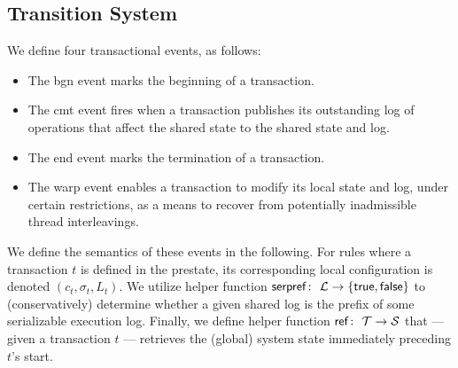 \subsection{Transition System}
\label{sec:transitionsystem}

We define four transactional events, as follows:
\begin{itemize}
\item The {\sf bgn} event marks the beginning of a transaction.
\item The {\sf cmt} event fires when a transaction publishes its outstanding log of operations that affect the shared state to the shared state and log.
\item The {\sf end} event marks the termination of a transaction.
\item The {\sf warp} event enables a transaction to modify its local state and log, under certain restrictions, as a means to recover from potentially inadmissible thread interleavings.
\end{itemize}
We define the semantics of these events in the following. For rules where a transaction $t$ is defined in the prestate, its corresponding local configuration is denoted $(c_t,\sigma_t,L_t)$. We utilize helper function ${\sf serpref} \colon\ {\cal L} \rightarrow \{ {\sf true},{\sf false} \}$ to (conservatively) determine whether a given shared log is the prefix of some serializable execution log. Finally, we define helper function
${\sf ref} \colon\ {\cal T} \rightarrow {\cal S}$ that --- given a transaction $t$ --- retrieves the (global) system state immediately preceding $t$'s start.

